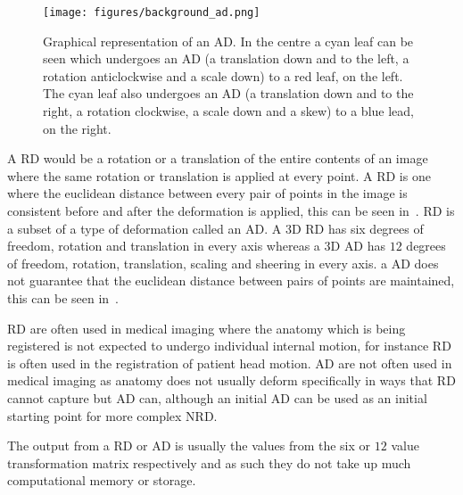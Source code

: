                 \begin{figure}
                    \centering
                    
                    \texttt{[image: figures/background\_ad.png]}
                    
                    \captionsetup{singlelinecheck=false, justification=raggedright}
                    \caption{Graphical representation of an \gls{AD}. In the centre a cyan leaf can be seen which undergoes an \gls{AD} (a translation down and to the left, a rotation anticlockwise and a scale down) to a red leaf, on the left. The cyan leaf also undergoes an \gls{AD} (a translation down and to the right, a rotation clockwise, a scale down and a skew) to a blue lead, on the right.} \label{fig:rigid_transformations_ad}
                \end{figure}
                
                A \gls{RD} would be a rotation or a translation of the entire contents of an image where the same rotation or translation is applied at every point. A \gls{RD} is one where the euclidean distance between every pair of points in the image is consistent before and after the deformation is applied, this can be seen in~. \gls{RD} is a subset of a type of deformation called an \gls{AD}. A \gls{3D} \gls{RD} has six degrees of freedom, rotation and translation in every axis whereas a \gls{3D} \gls{AD} has $12$ degrees of freedom, rotation, translation, scaling and sheering in every axis. a \gls{AD} does not guarantee that the euclidean distance between pairs of points are maintained, this can be seen in~.
                
                \gls{RD} are often used in medical imaging where the anatomy which is being registered is not expected to undergo individual internal motion, for instance \gls{RD} is often used in the registration of patient head motion. \gls{AD} are not often used in medical imaging as anatomy does not usually deform specifically in ways that \gls{RD} cannot capture but \gls{AD} can, although an initial \gls{AD} can be used as an initial starting point for more complex \gls{NRD}.
                
                The output from a \gls{RD} or \gls{AD} is usually the values from the six or $12$ value transformation matrix respectively and as such they do not take up much computational memory or storage.
                
